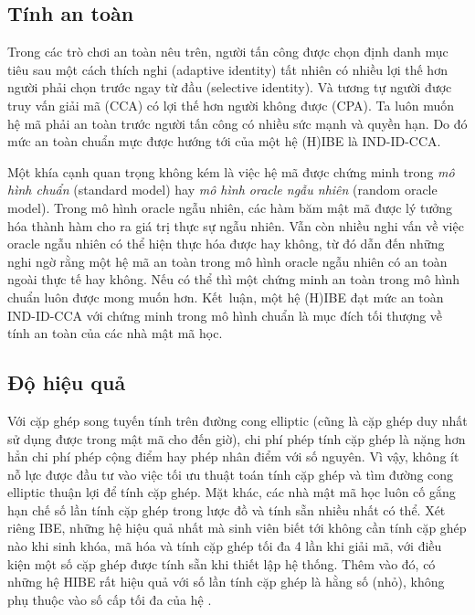 \documentclass[class=report, crop=false]{standalone}
\begin{document}
		\subsection{Tính an toàn}
			Trong các trò chơi an toàn nêu trên, người tấn công được chọn định danh mục tiêu sau một cách thích nghi (adaptive identity) tất nhiên có nhiều lợi thế hơn người phải chọn trước ngay từ đầu (selective identity). Và tương tự người được truy vấn giải mã (CCA) có lợi thế hơn người không được (CPA). Ta luôn muốn hệ mã phải an toàn trước người tấn công có nhiều sức mạnh và quyền hạn. Do đó mức an toàn chuẩn mực được hướng tới của một hệ (H)IBE là IND-ID-CCA.

			Một khía cạnh quan trọng không kém là việc hệ mã được chứng minh trong \textit{mô hình chuẩn} (standard model) hay \textit{mô hình oracle ngẫu nhiên} (random oracle model). Trong mô hình oracle ngẫu nhiên, các hàm băm mật mã được lý tưởng hóa thành hàm cho ra giá trị thực sự ngẫu nhiên. Vẫn còn nhiều nghi vấn về việc oracle ngẫu nhiên có thể hiện thực hóa được hay không, từ đó dẫn đến những nghi ngờ rằng một hệ mã an toàn trong mô hình oracle ngẫu nhiên có an toàn ngoài thực tế hay không. Nếu có thể thì một chứng minh an toàn trong mô hình chuẩn luôn được mong muốn hơn. Kết~luận, một hệ (H)IBE đạt mức an toàn IND-ID-CCA với chứng minh trong mô hình chuẩn là mục đích tối thượng về tính an toàn của các nhà mật mã học.
		\subsection{Độ hiệu quả}
			Với cặp ghép song tuyến tính trên đường cong elliptic (cũng là cặp ghép duy nhất sử dụng được trong mật mã cho đến giờ), chi phí phép tính cặp ghép là nặng hơn hẳn chi phí phép cộng điểm hay phép nhân điểm với số nguyên. Vì vậy, không ít nỗ lực được đầu tư vào việc tối ưu thuật toán tính cặp ghép và tìm đường cong elliptic thuận lợi để tính cặp ghép. Mặt khác, các nhà mật mã học luôn cố gắng hạn chế số lần tính cặp ghép trong lược đồ và tính sẵn nhiều nhất có thể. Xét riêng IBE, những hệ hiệu quả nhất mà sinh viên biết tới không cần tính cặp ghép nào khi sinh khóa, mã hóa và tính cặp ghép tối đa 4 lần khi giải mã, với điều kiện một số cặp ghép được tính sẵn khi thiết lập hệ thống. Thêm vào đó, có những hệ HIBE rất hiệu quả với số lần tính cặp ghép là hằng số (nhỏ), không phụ thuộc vào số cấp tối đa của hệ \cite{DBLP:conf/eurocrypt/BonehBG05}.
\end{document}
